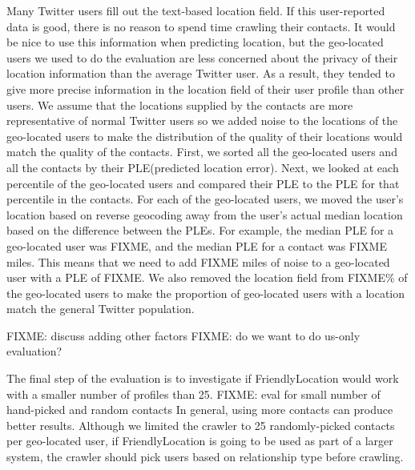 \ifdefined\THESIS
    Many Twitter users fill out the text-based location field.
    If this user-reported data is good, there is no reason to spend time
    crawling their contacts.
    It would be nice to use this information when predicting location, but
    the geo-located users we used to do the evaluation are less concerned about
    the privacy of their location information than the average Twitter user.
    As a result, they tended to give more precise information in the location
    field of their user profile than other users.
    We assume that the locations supplied by the contacts are more
    representative of normal Twitter users so we added noise to the locations
    of the geo-located users to make the distribution of the quality of their
    locations would match the quality of the contacts.
    First, we sorted all the geo-located users and all the contacts by their
    PLE(predicted location error).
    Next, we looked at each percentile of the geo-located users and compared
    their PLE to the PLE for that percentile in the contacts.
    For each of the geo-located users, we moved the user's location based on
    reverse geocoding away from the user's actual median location based on the
    difference between the PLEs.
    For example, the median PLE for a geo-located user was FIXME, and the median
    PLE for a contact was FIXME miles.
    This means that we need to add FIXME miles of noise to a geo-located user
    with a PLE of FIXME.
    We also removed the location field from FIXME\% of the geo-located users to
    make the proportion of geo-located users with a location match the general
    Twitter population.
\fi

FIXME: discuss adding other factors
FIXME: do we want to do us-only evaluation?

The final step of the evaluation is to investigate if FriendlyLocation would
work with a smaller number of profiles than 25.
%
FIXME: eval for small number of hand-picked and random contacts
%
In general, using more contacts can produce better results.
%
Although we limited the crawler to 25 randomly-picked contacts per geo-located
user, if FriendlyLocation is going to be used as part of a larger system, the
crawler should pick users based on relationship type before crawling.



